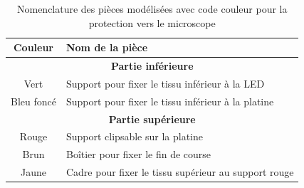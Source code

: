 \begin{table}[H]
    \centering
    \caption{Nomenclature des pièces modélisées avec code couleur pour la protection vers le microscope}
    \begin{tabular}{|c|l|}
        \hline
        \textbf{Couleur}                         & \textbf{Nom de la pièce}                             \\
        \hline
        \multicolumn{2}{|c|}{\textbf{Partie inférieure}}                                                \\
        \hline
        \textcolor[RGB]{70, 170, 70}{Vert}       & Support pour fixer le tissu inférieur à la LED       \\
        \textcolor[RGB]{30, 50, 150}{Bleu foncé} & Support pour fixer le tissu inférieur à la platine   \\
        \hline
        \multicolumn{2}{|c|}{\textbf{Partie supérieure}}                                                \\
        \hline
        \textcolor[RGB]{170, 50, 50}{Rouge}      & Support clipsable sur la platine                     \\
        \textcolor[RGB]{120, 70, 30}{Brun}       & Boîtier pour fixer le fin de course                  \\
        \textcolor[RGB]{233, 173, 56}{Jaune}     & Cadre pour fixer le tissu supérieur au support rouge \\
        \hline
    \end{tabular}
    \label{tab:nomenclature_pieces_microscope}
\end{table}

